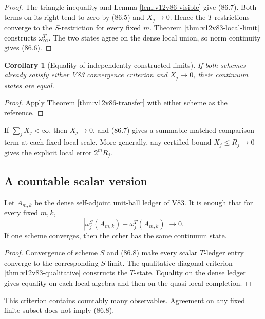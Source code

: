 \documentclass[11pt]{article}
\newtheorem{corollary}[theorem]{Corollary}
\theoremstyle{remark}
\begin{document}
\begin{proof}
The triangle inequality and Lemma
\ref{lem:v12v86-visible} give (86.7).  Both terms on its right tend
to zero by (86.5) and \(X_j\to0\).  Hence the \(T\)-restrictions
converge to the \(S\)-restriction for every fixed \(m\).  Theorem
\ref{thm:v12v83-local-limit} constructs \(\omega_\infty^T\).
The two states agree on the dense local union, so norm continuity
gives (86.6).
\end{proof}

\begin{corollary}[Equality of independently constructed limits]
\label{cor:v12v86-equality}
If both schemes already satisfy either V83 convergence criterion and
\(X_j\to0\), their continuum states are equal.
\end{corollary}

\begin{proof}
Apply Theorem \ref{thm:v12v86-transfer} with either scheme as the
reference.
\end{proof}

If \(\sum_jX_j<\infty\), then \(X_j\to0\), and (86.7) gives a
summable matched comparison term at each fixed local scale.  More
generally, any certified bound \(X_j\leq R_j\to0\) gives the explicit
local error \(2^mR_j\).

\subsection{A countable scalar version}

Let \(A_{m,k}\) be the dense self-adjoint unit-ball ledger of V83.
It is enough that for every fixed \(m,k\),
\begin{equation}
 |\omega_j^S(A_{m,k})-\omega_j^T(A_{m,k})|
 \longrightarrow0.                                         \tag{86.8}
\end{equation}
If one scheme converges, then the other has the same continuum state.

\begin{proof}
Convergence of scheme \(S\) and (86.8) make every scalar
\(T\)-ledger entry converge to the corresponding \(S\)-limit.
The qualitative diagonal criterion
\ref{thm:v12v83-qualitative} constructs the \(T\)-state.  Equality
on the dense ledger gives equality on each local algebra and then on
the quasi-local completion.
\end{proof}

This criterion contains countably many observables.  Agreement on
any fixed finite subset does not imply (86.8).
\end{document}
